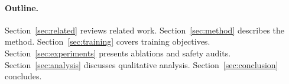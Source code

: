 \paragraph{Outline.}
Section~\ref{sec:related} reviews related work.
Section~\ref{sec:method} describes the method.
Section~\ref{sec:training} covers training objectives.
Section~\ref{sec:experiments} presents ablations and safety audits.
Section~\ref{sec:analysis} discusses qualitative analysis.
Section~\ref{sec:conclusion} concludes.
